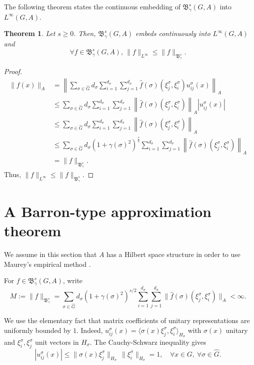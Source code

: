 \documentclass[12pt]{amsart}%
\newtheorem{theorem}{Theorem}[section]
\begin{document}
The following theorem states the continuous embedding of $\mathfrak{B}^{s}_\gamma (G,A)$ into  $L^{\infty}(G,A)$.
\begin{theorem}
Let $s\geq0$. Then, $\mathfrak{B}^{s}_\gamma (G,A)$ embeds continuously into $L^{\infty}(G,A)$ and $$\forall f\in \mathfrak{B}^{s}_\gamma (G,A), \, \|f\|_{L^\infty}\leq \|f\|_{\mathfrak{B}^{s}_\gamma}.$$
\end{theorem}
\begin{proof}
\begin{align*}
\|f(x)\|_A&= \left\|\sum\limits_{\sigma \in \widehat{G}}d_\sigma \sum\limits_{i=1}^{d_\sigma}\sum\limits_{j=1}^{d_\sigma}\widehat{f}(\sigma)(\xi_j^\sigma,\xi_i^\sigma)u_{ij}^\sigma (x)\right\|_A\\
&\leq \sum\limits_{\sigma \in \widehat{G}}d_\sigma \sum\limits_{i=1}^{d_\sigma}\sum\limits_{j=1}^{d_\sigma}\left\|\widehat{f}(\sigma)(\xi_j^\sigma,\xi_i^\sigma)\right\|_A |u_{ij}^\sigma (x)|\\
&\leq \sum\limits_{\sigma \in \widehat{G}}d_\sigma \sum\limits_{i=1}^{d_\sigma}\sum\limits_{j=1}^{d_\sigma}\left\|\widehat{f}(\sigma)(\xi_j^\sigma,\xi_i^\sigma)\right\|_A\\
&\leq \sum\limits_{\sigma \in \widehat{G}}d_\sigma (1+\gamma (\sigma)^2)^{\frac{s}{2}}\sum\limits_{i=1}^{d_\sigma}\sum\limits_{j=1}^{d_\sigma}\left\|\widehat{f}(\sigma)(\xi_j^\sigma,\xi_i^\sigma)\right\|_A\\
&=\|f\|_{\mathfrak{B}^{s}_\gamma}.
\end{align*}
Thus, $\|f\|_{L^\infty}\leq \|f\|_{\mathfrak{B}^{s}_\gamma}$. 
\end{proof}


\section{A Barron-type approximation theorem}\label{approximation}
 We assume in this section that $A$ has a  Hilbert space structure in order to use Maurey's empirical method \cite{Jones1992, Pisier1981}. 
 

For $f \in \mathfrak{B}^s_\gamma(G,A)$,  write
$$
M := \|f\|_{\mathfrak{B}^s_\gamma}
= \sum_{\sigma \in \widehat{G}} d_\sigma (1+\gamma(\sigma)^2)^{s/2}
  \sum_{i=1}^{d_\sigma}\sum_{j=1}^{d_\sigma}
  \big\| \widehat{f}(\sigma)(\xi^\sigma_j,\xi^\sigma_i) \big\|_A < \infty .
$$
 
We use the elementary fact that matrix coefficients of unitary
representations  are uniformly bounded by $1$. Indeed, 
$u^\sigma_{ij}(x) = \langle \sigma(x)\xi^\sigma_j,\xi^\sigma_i\rangle_{H_\sigma}$ with
$\sigma(x)$ unitary and $\xi^\sigma_i,\xi^\sigma_j$ unit vectors in $H_\sigma$. The  Cauchy-Schwarz inequality gives
\begin{equation}\label{eq:bounded-atoms}
|u^\sigma_{ij}(x)| \le \|\sigma(x)\xi^\sigma_j\|_{H_\sigma}\,\|\xi^\sigma_i\|_{H_\sigma} = 1,
\quad \forall x \in G,\ \forall \sigma \in \widehat{G}.
\end{equation}
 
\end{document}
